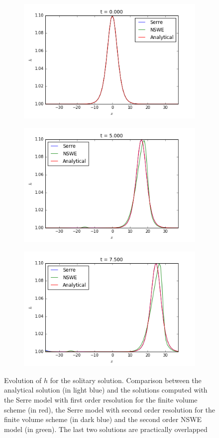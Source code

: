 \begin{figure}[h!]
	\begin{subfigure}{.3\linewidth}
		\includegraphics[scale=.3]{figures/Serre/4x4solitary1h.png}	
	\end{subfigure}
	\begin{subfigure}{.3\linewidth}
		\includegraphics[scale=.3]{figures/Serre/4x4solitary2h.png}	
	\end{subfigure}
	\begin{subfigure}{.3\linewidth}
		\includegraphics[scale=.3]{figures/Serre/4x4solitary3h.png}	
	\end{subfigure}
	\caption{Evolution of $h$ for the solitary solution. Comparison between the analytical solution (in light blue) and the solutions computed with the Serre model with first order resolution for the finite volume scheme (in red), the Serre model with second order resolution for the finite volume scheme (in dark blue)  and the second order NSWE model (in green). The last two solutions are practically overlapped\label{fig:solitaryh}}
\end{figure}

